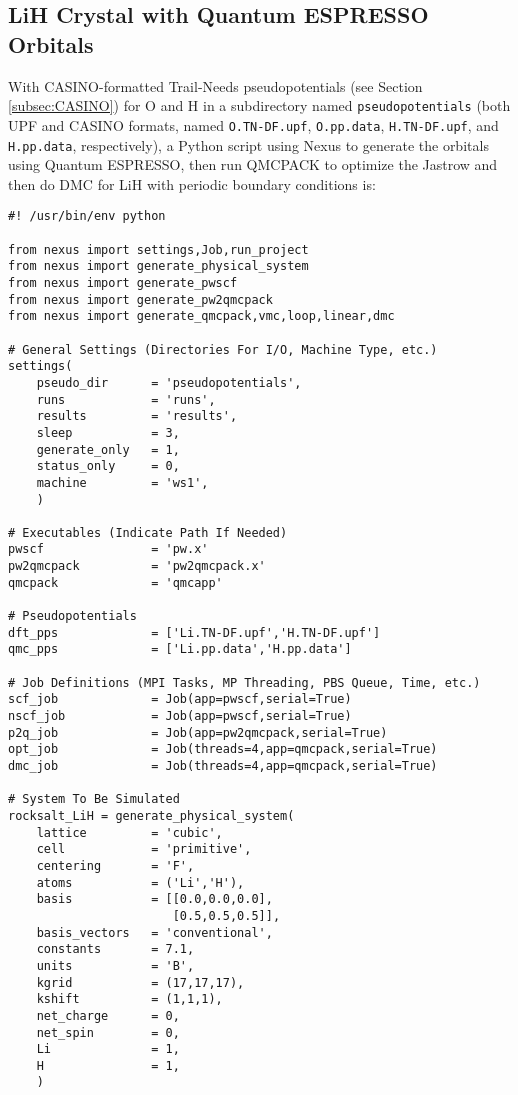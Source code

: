 \subsection{LiH Crystal with Quantum ESPRESSO Orbitals}
With CASINO-formatted Trail-Needs pseudopotentials (see Section \ref{subsec:CASINO}) for O and H in a subdirectory named \texttt{pseudopotentials} (both UPF and CASINO  formats, named \texttt{O.TN-DF.upf}, \texttt{O.pp.data}, \texttt{H.TN-DF.upf}, and \texttt{H.pp.data}, respectively), a Python script using Nexus to generate the orbitals using Quantum ESPRESSO, then run QMCPACK to optimize the Jastrow and then do DMC for LiH with periodic boundary conditions is:
\begin{lstlisting}[caption=Nexus example for bulk LiH using Quantum ESPRESSO orbitals and CASINO pseudopotentials]
#! /usr/bin/env python

from nexus import settings,Job,run_project
from nexus import generate_physical_system
from nexus import generate_pwscf
from nexus import generate_pw2qmcpack
from nexus import generate_qmcpack,vmc,loop,linear,dmc

# General Settings (Directories For I/O, Machine Type, etc.)
settings(
    pseudo_dir      = 'pseudopotentials',
    runs            = 'runs',
    results         = 'results',
    sleep           = 3,
    generate_only   = 1,
    status_only     = 0,
    machine         = 'ws1',
    )

# Executables (Indicate Path If Needed)
pwscf               = 'pw.x'
pw2qmcpack          = 'pw2qmcpack.x'
qmcpack             = 'qmcapp'

# Pseudopotentials
dft_pps             = ['Li.TN-DF.upf','H.TN-DF.upf']
qmc_pps             = ['Li.pp.data','H.pp.data']

# Job Definitions (MPI Tasks, MP Threading, PBS Queue, Time, etc.)
scf_job             = Job(app=pwscf,serial=True)
nscf_job            = Job(app=pwscf,serial=True)
p2q_job             = Job(app=pw2qmcpack,serial=True)
opt_job             = Job(threads=4,app=qmcpack,serial=True)
dmc_job             = Job(threads=4,app=qmcpack,serial=True)

# System To Be Simulated
rocksalt_LiH = generate_physical_system(
    lattice         = 'cubic',
    cell            = 'primitive',
    centering       = 'F',
    atoms           = ('Li','H'),
    basis           = [[0.0,0.0,0.0],
                       [0.5,0.5,0.5]],
    basis_vectors   = 'conventional',
    constants       = 7.1,
    units           = 'B',
    kgrid           = (17,17,17),
    kshift          = (1,1,1),
    net_charge      = 0,
    net_spin        = 0,
    Li              = 1,
    H               = 1,
    )


\end{lstlisting}
